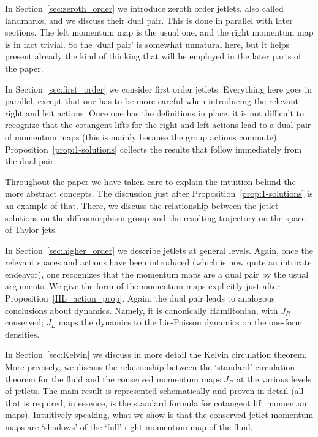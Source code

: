 \documentclass[12pt]{amsart}
\begin{document}
In Section~\ref{sec:zeroth_order} we introduce zeroth order jetlets, also called landmarks, and we discuss their dual pair. This is done in parallel with later sections. The left momentum map is the usual one, and the right momentum map is in fact trivial. So the `dual pair' is somewhat unnatural here, but it helps present already the kind of thinking that will be employed in the later parts of the paper. 
%

In Section~\ref{sec:first_order} we consider first order jetlets. Everything here goes in parallel, except that one has to be more careful when introducing the relevant right and left actions. Once one has the definitions in place, it is not difficult to recognize that the cotangent lifts for the right and left actions lead to a dual pair of momentum maps (this is mainly because the group actions commute).  Proposition~\ref{prop:1-solutions} collects the results that follow immediately from the dual pair.

Throughout the paper we have taken care to explain the intuition behind the more abstract concepts. The discussion just after Proposition~\ref{prop:1-solutions} is an example of that. There, we discuss the relationship between the jetlet solutions on the diffeomorphism group and the resulting trajectory on the space of Taylor jets.

In Section~\ref{sec:higher_order} we describe jetlets at general levels. Again, once the relevant spaces and actions have been introduced (which is now quite an intricate endeavor), one recognizes that the momentum maps are a dual pair by the usual arguments. We give the form of the momentum maps explicitly just after Proposition~\ref{HL_action_prop}. Again, the dual pair leads to analogous conclusions about dynamics. Namely, it is canonically Hamiltonian, with $J_R$  conserved; $J_L$ maps the dynamics to the Lie-Poisson dynamics on the one-form densities.

In Section~\ref{sec:Kelvin} we discuss in more detail the Kelvin circulation theorem. More precisely, we discuss the relationship between the `standard' circulation theorem for the fluid and the conserved momentum maps $J_R$  at the various levels of jetlets. The main result is represented schematically and proven in detail (all that is required, in essence, is the standard formula for cotangent lift momentum maps). Intuitively speaking, what we show is that the conserved jetlet momentum maps are `shadows' of the `full' right-momentum map of the fluid.\\
\end{document}
